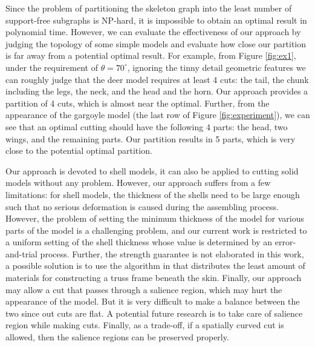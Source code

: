 Since the problem of partitioning the skeleton graph into the least number of support-free subgraphs is NP-hard, it is impossible to obtain an optimal result in polynomial time. However, we can evaluate the effectiveness of our approach by judging the topology of some simple models and evaluate how close our partition is far away from a potential optimal result. For example, from Figure \ref{fig:ex1}, under the requirement of $\theta = 70^{\circ}$, ignoring the tinny detail geometric features we can roughly judge that the deer model requires at least 4 cuts: the tail, the chunk including the legs, the neck, and the head and the horn. Our approach provides a partition of 4 cuts, which is almost near the optimal. Further, from the appearance of the gargoyle model (the last row of Figure \ref{fig:experiment}), we can see that an optimal cutting should have the following 4 parts: the head, two wings, and the remaining parts. Our partition results in 5 parts, which is very close to the potential optimal partition.

Our approach is devoted to shell models, it can also be applied to cutting solid models without any problem. However, our approach suffers from a few limitations: for shell models, the thickness of the shells need to be large enough such that no serious deformation is caused during the assembling process. However, the problem of setting the minimum thickness of the model for various parts of the model is a challenging problem, and our current work is restricted to a uniform setting of the shell thickness whose value is determined by an error-and-trial process. Further, the strength guarantee is not elaborated in this work, a possible solution is to use the algorithm in \cite{WangWYLTTDCL13} that distributes the least amount of materials for constructing a truss frame beneath the skin. Finally, our approach may allow a cut that passes through a salience region, which may hurt the appearance of the model. But it is very difficult to make a balance between the two since out cuts are flat. A potential future research is to take care of salience region while making cuts. Finally, as a trade-off, if a spatially curved cut is allowed, then the salience regions can be preserved properly.
